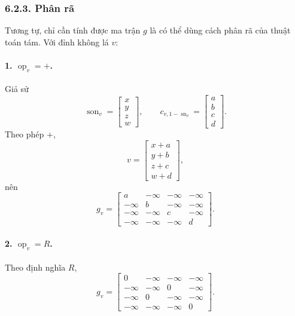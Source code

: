 \documentclass[11pt]{article}
\begin{document}
\subsubsection*{6.2.3. Phân rã}

Tương tự, chỉ cần tính được ma trận \(g\) là có thể dùng cách phân rã của
thuật toán tám. Với đỉnh không lá \(v\):

\paragraph{1. \(\operatorname{op}_v=+\).}
Giả sử
\[
\operatorname{son}_v=\begin{bmatrix}x\\y\\z\\w\end{bmatrix},\qquad
c_{v,1-\operatorname{sn}_v}=\begin{bmatrix}a\\b\\c\\d\end{bmatrix}.
\]
Theo phép \(+\),
\[
v=\begin{bmatrix}x+a\\y+b\\z+c\\w+d\end{bmatrix},
\]
nên
\[
g_v=
\begin{bmatrix}
a&-\infty&-\infty&-\infty\\
-\infty&b&-\infty&-\infty\\
-\infty&-\infty&c&-\infty\\
-\infty&-\infty&-\infty&d
\end{bmatrix}.
\]

\paragraph{2. \(\operatorname{op}_v=R\).}
Theo định nghĩa \(R\),
\[
g_v=
\begin{bmatrix}
0&-\infty&-\infty&-\infty\\
-\infty&-\infty&0&-\infty\\
-\infty&0&-\infty&-\infty\\
-\infty&-\infty&-\infty&0
\end{bmatrix}.
\]
\end{document}
